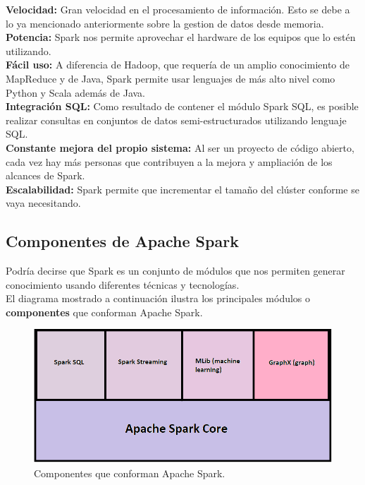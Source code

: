 \begin{UClist}
	\UCli \textbf{Velocidad:} Gran velocidad en el procesamiento de información. Esto se debe a lo ya mencionado anteriormente sobre la gestion de datos desde memoria.\\
	\UCli \textbf{Potencia:} Spark nos permite aprovechar el hardware de los equipos que lo estén utilizando.\\

	\UCli \textbf{Fácil uso:} A diferencia de Hadoop, que requería de un amplio conocimiento de MapReduce y de Java, Spark permite usar lenguajes de más alto nivel como Python y Scala además de Java.\\

	\UCli \textbf{Integración SQL:} Como resultado de contener el módulo Spark SQL, es posible realizar consultas en conjuntos de datos semi-estructurados utilizando lenguaje SQL.\\

	\UCli \textbf{Constante mejora del propio sistema:} Al ser un proyecto de código abierto, cada vez hay más personas que contribuyen a la mejora y ampliación de los alcances de Spark.\\

	\UCli \textbf{Escalabilidad:} Spark permite que incrementar el tamaño del clúster conforme se vaya necesitando.\\
\end{UClist}
\newpage
\subsection{Componentes de Apache Spark}
Podría decirse que Spark es un conjunto de módulos que nos permiten generar conocimiento usando diferentes técnicas y tecnologías\cite{spark}.\\

El diagrama mostrado a continuación ilustra los principales módulos o \textbf{componentes} que conforman Apache Spark.\\

\begin{figure}[H]
	\hypertarget{fig:sparkComponentes}{\hspace{1pt}}
	\begin{center}
		\includegraphics{capitulo2/images/sparkComponentes.png}
		\caption{Componentes que conforman Apache Spark.}
		\label{fig:sparkComponentes}
	\end{center}
\end{figure}


